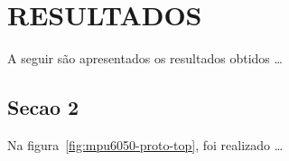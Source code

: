\chapter{RESULTADOS}\label{chap:resuldatos}

A seguir são apresentados os resultados obtidos \ldots


\section{Secao 2}\label{sec:Secao_2}

Na figura~\ref{fig:mpu6050-proto-top}, foi realizado \ldots
